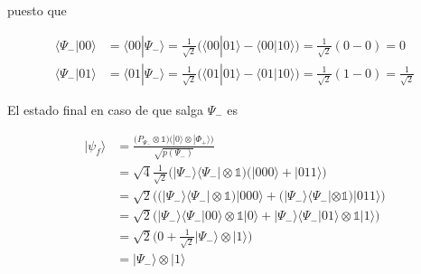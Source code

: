 \documentclass{article}
\begin{document}
puesto que 

\begin{align*}
  \langle \Psi_-|00\rangle 
    &= \langle 00|\Psi_-\rangle 
    = \frac{1}{\sqrt{2}}\Big(
    \langle 00|01\rangle - \langle 00|10\rangle\Big)
    = \frac{1}{\sqrt{2}}(0 - 0)
    = 0 \\
  \langle \Psi_-|01\rangle
    &=\langle 01|\Psi_-\rangle 
    = \frac{1}{\sqrt{2}}\Big(
      \langle 01|01\rangle - \langle 01|10\rangle\Big)
    = \frac{1}{\sqrt{2}}(1 - 0)
    = \frac{1}{\sqrt{2}}
\end{align*}

El estado final en caso de que salga $\Psi_-$ es 

\begin{align*}
  |\psi_f\rangle &= \frac
    {\Big(P_{\Psi_-} \otimes \mathbb{1}\Big)
    \Big(|0\rangle\otimes|\Phi_+\rangle\Big)}
    {\sqrt{p(\Psi_-)}} \\ 
  &= \sqrt{4}\frac{1}{\sqrt{2}}
    \Big(|\Psi_-\rangle\langle \Psi_-| \otimes \mathbb{1}\Big)
    \Big(|000\rangle + |011\rangle\Big) \\
  &= \sqrt{2}\Big(
  \big(|\Psi_-\rangle\langle \Psi_-| \otimes \mathbb{1}\big)|000
    \rangle +
  \big(|\Psi_-\rangle\langle \Psi_-| \otimes \mathbb{1}\big)|011
    \rangle
  \Big) \\ 
  &= \sqrt{2}\Big(
  |\Psi_-\rangle\langle \Psi_-|00\rangle \otimes 
    \mathbb{1}|0\rangle +
  |\Psi_-\rangle\langle \Psi_-|01\rangle \otimes 
    \mathbb{1}|1\rangle
  \Big) \\ 
  &= \sqrt{2}\Big(
    0 + \frac{1}{\sqrt{2}}|\Psi_-\rangle \otimes |1 \rangle
  \Big) \\ 
  &= |\Psi_-\rangle \otimes |1 \rangle
\end{align*}
\end{document}
